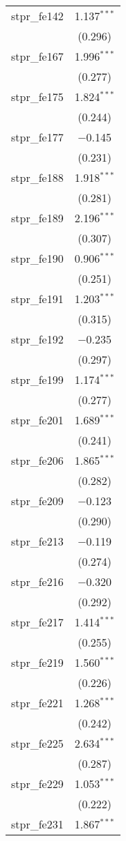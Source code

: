 \begin{table}[!htbp]
\begin{tabular}{@{\extracolsep{5pt}}lc}
  stpr\_fe142 & 1.137$^{***}$ \\ 
  & (0.296) \\ 
  stpr\_fe167 & 1.996$^{***}$ \\ 
  & (0.277) \\ 
  stpr\_fe175 & 1.824$^{***}$ \\ 
  & (0.244) \\ 
  stpr\_fe177 & $-$0.145 \\ 
  & (0.231) \\ 
  stpr\_fe188 & 1.918$^{***}$ \\ 
  & (0.281) \\ 
  stpr\_fe189 & 2.196$^{***}$ \\ 
  & (0.307) \\ 
  stpr\_fe190 & 0.906$^{***}$ \\ 
  & (0.251) \\ 
  stpr\_fe191 & 1.203$^{***}$ \\ 
  & (0.315) \\ 
  stpr\_fe192 & $-$0.235 \\ 
  & (0.297) \\ 
  stpr\_fe199 & 1.174$^{***}$ \\ 
  & (0.277) \\ 
  stpr\_fe201 & 1.689$^{***}$ \\ 
  & (0.241) \\ 
  stpr\_fe206 & 1.865$^{***}$ \\ 
  & (0.282) \\ 
  stpr\_fe209 & $-$0.123 \\ 
  & (0.290) \\ 
  stpr\_fe213 & $-$0.119 \\ 
  & (0.274) \\ 
  stpr\_fe216 & $-$0.320 \\ 
  & (0.292) \\ 
  stpr\_fe217 & 1.414$^{***}$ \\ 
  & (0.255) \\ 
  stpr\_fe219 & 1.560$^{***}$ \\ 
  & (0.226) \\ 
  stpr\_fe221 & 1.268$^{***}$ \\ 
  & (0.242) \\ 
  stpr\_fe225 & 2.634$^{***}$ \\ 
  & (0.287) \\ 
  stpr\_fe229 & 1.053$^{***}$ \\ 
  & (0.222) \\ 
  stpr\_fe231 & 1.867$^{***}$ \\ 

\end{tabular}
\end{table}
